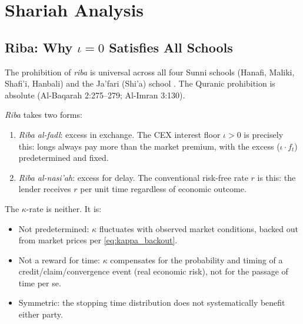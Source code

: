\documentclass[10pt,twocolumn]{article}
\theoremstyle{plain}
\theoremstyle{definition}
\begin{document}
\begin{center}
\end{center}

\section{Shariah Analysis}
\label{sec:shariah}

\subsection{Riba: Why $\iota = 0$ Satisfies All Schools}

The prohibition of \textit{riba} is universal across all four
Sunni schools (Hanafi, Maliki, Shafi'i, Hanbali) and the Ja'fari
(Shi'a) school \cite{Usmani2002,ElGamal2006}. The Quranic
prohibition is absolute (Al-Baqarah 2:275--279; Al-Imran 3:130).

\textit{Riba} takes two forms:
\begin{enumerate}[leftmargin=*,noitemsep]
\item \textit{Riba al-fadl}: excess in exchange.
The CEX interest floor $\iota > 0$ is precisely this: longs always
pay more than the market premium, with the excess ($\iota \cdot f_t$)
predetermined and fixed.
\item \textit{Riba al-nasi'ah}: excess for delay.
The conventional risk-free rate $r$ is this: the lender receives
$r$ per unit time regardless of economic outcome.
\end{enumerate}

The $\kappa$-rate is neither. It is:
\begin{itemize}[leftmargin=*,noitemsep]
\item Not predetermined: $\kappa$ fluctuates with observed market
conditions, backed out from market prices per \eqref{eq:kappa_backout}.
\item Not a reward for time: $\kappa$ compensates for the
probability and timing of a credit/claim/convergence event
(real economic risk), not for the passage of time per se.
\item Symmetric: the stopping time distribution does not
systematically benefit either party.
\end{itemize}
\end{document}
